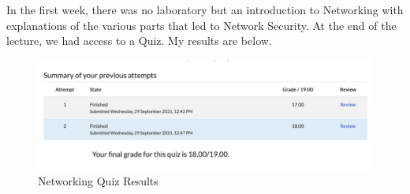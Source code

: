 In the first week, there was no laboratory but an introduction to Networking
with explanations of the various parts that led to Network Security. At the end of the lecture,
we had access to a Quiz. My results are below.

\begin{figure}[ht]
	\centering
	\includegraphics[width=1\textwidth]{figures/networking-quiz}
	\caption{Networking Quiz Results}
	\label{f:Networking-Quiz}
\end{figure}
